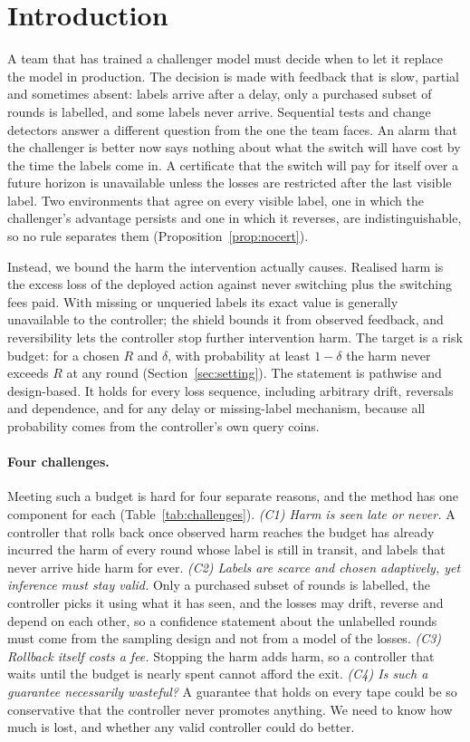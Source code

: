 \documentclass[10pt]{article}
\theoremstyle{plain}
\theoremstyle{definition}
\begin{document}
\section{Introduction}
A team that has trained a challenger model must decide when to let it replace the model in production.
The decision is made with feedback that is slow, partial and sometimes absent: labels arrive after a delay, only a purchased subset of rounds is labelled, and some labels never arrive.
Sequential tests and change detectors answer a different question from the one the team faces.
An alarm that the challenger is better now says nothing about what the switch will have cost by the time the labels come in.
A certificate that the switch will pay for itself over a future horizon is unavailable unless the losses are restricted after the last visible label.
Two environments that agree on every visible label, one in which the challenger's advantage persists and one in which it reverses, are indistinguishable, so no rule separates them (Proposition~\ref{prop:nocert}).

Instead, we bound the harm the intervention actually causes.
Realised harm is the excess loss of the deployed action against never switching plus the switching fees paid. With missing or unqueried labels its exact value is generally unavailable to the controller; the shield bounds it from observed feedback, and reversibility lets the controller stop further intervention harm.
The target is a risk budget: for a chosen $R$ and $\delta$, with probability at least $1-\delta$ the harm never exceeds $R$ at any round (Section~\ref{sec:setting}).
The statement is pathwise and design-based.
It holds for every loss sequence, including arbitrary drift, reversals and dependence, and for any delay or missing-label mechanism, because all probability comes from the controller's own query coins.

\paragraph{Four challenges.}
Meeting such a budget is hard for four separate reasons, and the method has one component for each (Table~\ref{tab:challenges}).
\emph{(C1) Harm is seen late or never.} A controller that rolls back once observed harm reaches the budget has already incurred the harm of every round whose label is still in transit, and labels that never arrive hide harm for ever.
\emph{(C2) Labels are scarce and chosen adaptively, yet inference must stay valid.} Only a purchased subset of rounds is labelled, the controller picks it using what it has seen, and the losses may drift, reverse and depend on each other, so a confidence statement about the unlabelled rounds must come from the sampling design and not from a model of the losses.
\emph{(C3) Rollback itself costs a fee.} Stopping the harm adds harm, so a controller that waits until the budget is nearly spent cannot afford the exit.
\emph{(C4) Is such a guarantee necessarily wasteful?} A guarantee that holds on every tape could be so conservative that the controller never promotes anything. We need to know how much is lost, and whether any valid controller could do better.
\end{document}
